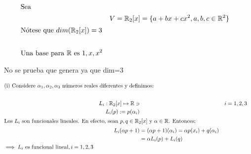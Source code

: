 \begin{exercise}
\begin{align}
    \intertext{Sea}
    && V= \mathbb{R}_2 [x]=\{a+bx+cx^2, a,b,c\in\mathbb{R}^2\}&&\\
    \intertext{Nótese que $dim(\mathbb{R}_2 [x])=3$}\\
    \text{Una base para $\mathbb{R}$ es $1,x,x^2$}\\
\end{align}
\end{exercise}
\begin{remark}
No se prueba que genera ya que dim=3
\end{remark}
\begin{proposition}
\begin{align}
     \intertext{(i) Considere $\alpha_1,\alpha_2,\alpha_3$ números reales diferentes y definimos:}\\
    &&L_i : \mathbb{R}_2[x]\mapsto\mathbb{R}\ni && i=1,2,3\\
    &&L_i (p) := p(\alpha_i)&&\\
    \intertext{Los $L_i$ son funcionales lineales. En efecto, sean $p,q \in \mathbb{R}_2 [x]$ y $\alpha \in \mathbb{R}$. Entonces:}
    && L_i(\alpha p+1) &= (\alpha p +1)(\alpha_i) = \alpha p(x_i)+q(\alpha_i)&&\\
    && &= \alpha L_i(p)+L_i(q)&&\\
    \implies L_i \text{ es funcional lineal}, i=1,2,3\\
\end{align}


\end{proposition}
